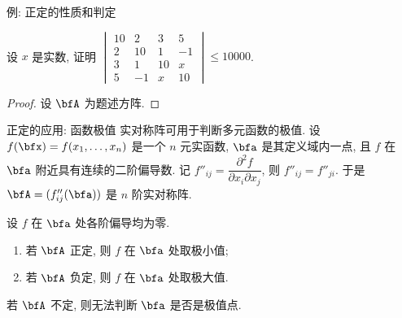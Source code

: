 \begin{frame}{例: 正定的性质和判定}
	\beqskip{2pt}
	\onslide<+->
	\begin{example}
		设 $x$ 是实数, 证明 $\begin{vmatrix}
			10&2&3&5\\
			2&10&1&-1\\
			3&1&10&x\\
			5&-1&x&10
		\end{vmatrix}\le 10000$.
	\end{example}
	\onslide<+->
	\begin{proof}
		设 $\bfA$ 为题述方阵.
	\vspace{-.5\baselineskip}
	\end{proof}
	\endgroup
\end{frame}


\begin{frame}{正定的应用: 函数极值\noexer}
	\onslide<+->
	实对称阵可用于判断多元函数的极值.
	\onslide<+->
	设 $f(\bfx)=f(x_1,\dots,x_n)$ 是一个 $n$ 元实函数, $\bfa$ 是其定义域内一点, 且 $f$ 在 $\bfa$ 附近具有连续的二阶偏导数.
	\onslide<+->
	记 $f''_{ij}=\dfrac{\partial^2 f}{\partial x_i\partial x_j}$, 则 $f''_{ij}=f''_{ji}$.
	\onslide<+->
	于是 $\bfA=(f''_{ij}(\bfa))$ 是 $n$ 阶实对称阵.
	\onslide<+->
	\begin{theorem}
		设 $f$ 在 $\bfa$ 处各阶偏导均为零.
		\begin{enumerate}
			\item 若 $\bfA$ 正定, 则 $f$ 在 $\bfa$ 处取极小值;
			\item 若 $\bfA$ 负定, 则 $f$ 在 $\bfa$ 处取极大值.
		\end{enumerate}
	\end{theorem}
	\onslide<+->
	若 $\bfA$ 不定, 则无法判断 $\bfa$ 是否是极值点.
\end{frame}


